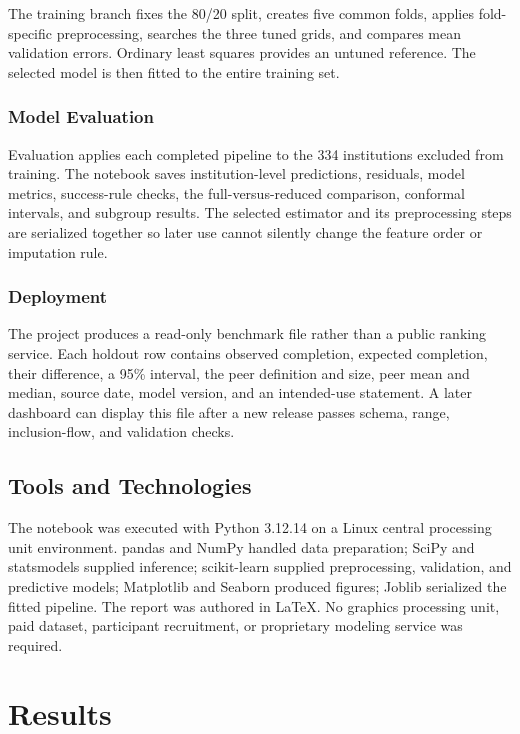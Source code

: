 \documentclass[12pt,a4paper]{article}
\begin{document}
The training branch fixes the 80/20 split, creates five common folds, applies fold-specific preprocessing, searches the three tuned grids, and compares mean validation errors. Ordinary least squares provides an untuned reference. The selected model is then fitted to the entire training set.

\subsubsection{Model Evaluation}

Evaluation applies each completed pipeline to the 334 institutions excluded from training. The notebook saves institution-level predictions, residuals, model metrics, success-rule checks, the full-versus-reduced comparison, conformal intervals, and subgroup results. The selected estimator and its preprocessing steps are serialized together so later use cannot silently change the feature order or imputation rule.

\subsubsection{Deployment}

The project produces a read-only benchmark file rather than a public ranking service. Each holdout row contains observed completion, expected completion, their difference, a 95\% interval, the peer definition and size, peer mean and median, source date, model version, and an intended-use statement. A later dashboard can display this file after a new release passes schema, range, inclusion-flow, and validation checks.

\subsection{Tools and Technologies}

The notebook was executed with Python 3.12.14 on a Linux central processing unit environment. pandas and NumPy handled data preparation; SciPy and statsmodels supplied inference; scikit-learn supplied preprocessing, validation, and predictive models; Matplotlib and Seaborn produced figures; Joblib serialized the fitted pipeline. The report was authored in \LaTeX. No graphics processing unit, paid dataset, participant recruitment, or proprietary modeling service was required.

\section{Results}
\end{document}
